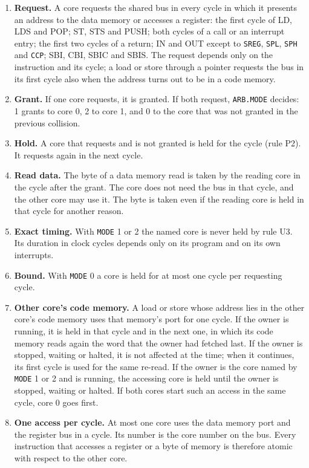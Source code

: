\documentclass[10pt,a4paper]{article}
\newcommand{\reg}[1]{\texttt{#1}}
\begin{document}
\begin{enumerate}[label=\textbf{U\arabic*},leftmargin=2.6em]
\item \textbf{Request.} A core requests the shared bus in every cycle in which it presents an address to the data
memory or accesses a register: the first cycle of LD, LDS and POP; ST, STS and PUSH; both cycles of a call or
an interrupt entry; the first two cycles of a return; IN and OUT except to \reg{SREG}, \reg{SPL}, \reg{SPH}
and \reg{CCP}; SBI, CBI, SBIC and SBIS. The request depends only on the instruction and its cycle; a load or store through a pointer requests the bus in its first cycle also when the address turns out to be in a code memory.
\item \textbf{Grant.} If one core requests, it is granted. If both request, \reg{ARB.MODE} decides: 1 grants to
core 0, 2 to core 1, and 0 to the core that was not granted in the previous collision.
\item \textbf{Hold.} A core that requests and is not granted is held for the cycle (rule P2). It requests again
in the next cycle.
\item \textbf{Read data.} The byte of a data memory read is taken by the reading core in the cycle after the
grant. The core does not need the bus in that cycle, and the other core may use it. The byte is taken even if
the reading core is held in that cycle for another reason.
\item \textbf{Exact timing.} With \reg{MODE} 1 or 2 the named core is never held by rule U3. Its duration in
clock cycles depends only on its program and on its own interrupts.
\item \textbf{Bound.} With \reg{MODE} 0 a core is held for at most one cycle per requesting cycle.
\item \textbf{Other core's code memory.} A load or store whose address lies in the other core's code memory uses
that memory's port for one cycle. If the owner is running, it is held in that cycle and in the next one, in
which its code memory reads again the word that the owner had fetched last. If the owner is stopped, waiting
or halted, it is not affected at the time; when it continues, its first cycle is used for the same re-read. If
the owner is the core named by \reg{MODE} 1 or 2 and is running, the accessing core is held until the owner is
stopped, waiting or halted. If both cores start such an access in the same cycle, core 0 goes first.
\item \textbf{One access per cycle.} At most one core uses the data memory port and the register bus in a cycle.
Its number is the core number on the bus. Every instruction that accesses a register or a byte of memory is
therefore atomic with respect to the other core.
\end{enumerate}
\end{document}
